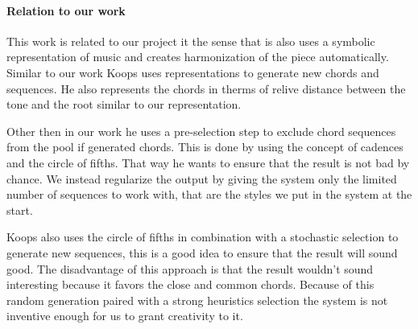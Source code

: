 \paragraph{Relation to our work}
This work is related to our project it the sense that is also uses a symbolic representation of music and creates harmonization of the piece automatically. Similar to our work Koops uses representations to generate new chords and sequences. He also represents the chords in therms of relive distance between the tone and the root similar to our representation.

Other then in our work he uses a pre-selection step to exclude chord sequences from the pool if generated chords. This is done by using the concept of cadences and the circle of fifths. That way he wants to ensure that the result is not bad by chance. We instead regularize the output by giving the system only the limited number of sequences to work with, that are the styles we put in the system at the start. 

Koops also uses the circle of fifths in combination with a stochastic selection to generate new sequences, this is a good idea to ensure that the result will sound good. The disadvantage of this approach is that the result wouldn't sound interesting because it favors the close and common chords. Because of this random generation paired with a strong heuristics selection the system is not inventive enough for us to grant creativity to it.





  
